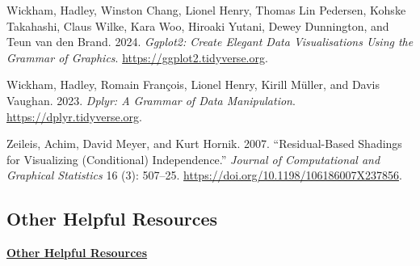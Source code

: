 \documentclass[
  letterpaper,
  DIV=11,
  numbers=noendperiod]{scrartcl}
\newlength{\cslhangindent}
\newenvironment{CSLReferences}[2] %
 {\begin{list}{}{%
  \setlength{\itemindent}{0pt}
  \setlength{\leftmargin}{0pt}
  \setlength{\parsep}{0pt}
  \ifodd #1
   \setlength{\leftmargin}{\cslhangindent}
   \setlength{\itemindent}{-1\cslhangindent}
  \fi
  \setlength{\itemsep}{#2\baselineskip}}}
 {\end{list}}
\begin{document}
\begin{CSLReferences}{1}{0}
Wickham, Hadley, Winston Chang, Lionel Henry, Thomas Lin Pedersen,
Kohske Takahashi, Claus Wilke, Kara Woo, Hiroaki Yutani, Dewey
Dunnington, and Teun van den Brand. 2024. \emph{Ggplot2: Create Elegant
Data Visualisations Using the Grammar of Graphics}.
\url{https://ggplot2.tidyverse.org}.

Wickham, Hadley, Romain François, Lionel Henry, Kirill Müller, and Davis
Vaughan. 2023. \emph{Dplyr: A Grammar of Data Manipulation}.
\url{https://dplyr.tidyverse.org}.

Zeileis, Achim, David Meyer, and Kurt Hornik. 2007. {``Residual-Based
Shadings for Visualizing (Conditional) Independence.''} \emph{Journal of
Computational and Graphical Statistics} 16 (3): 507--25.
\url{https://doi.org/10.1198/106186007X237856}.

\end{CSLReferences}

\subsection{Other Helpful Resources}\label{other-helpful-resources}

\href{./additionalResources.html}{\textbf{Other Helpful Resources}}
\end{document}
